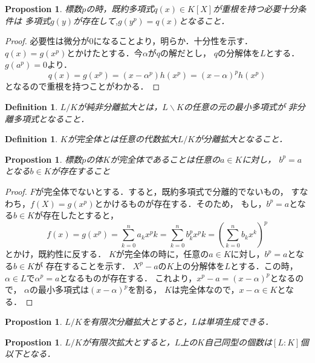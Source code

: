 \documentclass{ujarticle}
\newtheorem{dfn}[thm]{Definition}
\newtheorem{prop}[thm]{Propostion}
\begin{document}
\begin{prop}
  標数$p$の時，既約多項式$q(x) \in K[X]$が重根を持つ必要十分条件は
  多項式$g(y)$が存在して,$g(y^p)=q(x)$となること．
\end{prop}
\begin{proof}
  必要性は微分が$0$になることより，明らか．十分性を示す．
  $q(x)=g(x^p)$とかけたとする．今$ \alpha$が$q$の解だとし，
  $q$の分解体を$L$とする．$g(a^p)=0$より．
  \begin{equation*}
   q(x)=g(x^p)=(x-\alpha^p)h(x^p)=(x-\alpha)^ph(x^p)
  \end{equation*}
  となるので重根を持つことがわかる．
\end{proof}

\begin{dfn}
 $L/K$が純非分離拡大とは，$L\backslash K$の任意の元の最小多項式が
 非分離多項式となること．
\end{dfn}

\begin{dfn}
 $K$が完全体とは任意の代数拡大$L/K$が分離拡大となること．
\end{dfn}

\begin{prop}
 標数$p$の体$K$が完全体であることは任意の$a \in K$に対し，
 $b^p=a$となる$b \in K$が存在すること
\end{prop}
\begin{proof}
  $F$が完全体でないとする．すると，既約多項式で分離的でないもの，
  すなわち，$f(X)=g(x^p)$とかけるものが存在する．そのため，
  もし，$b^p=a$となる$b \in K$が存在したとすると，
  \begin{equation*}
   f(x)=g(x^p)=\sum_{k=0}^na_kx^pk=
  　\sum_{k=0}^nb_k^px^pk=(\sum_{k=0}^nb_kx^k)^p
  \end{equation*}
  とかけ，既約性に反する．
  $K$が完全体の時に，任意の$a \in K$に対し，$b^p=a$となる$b \in K$が
  存在することを示す．
  $X^p-a$の$K$上の分解体を$L$とする．この時，
  $\alpha \in L$で$\alpha^p=a$となるものが存在する．
  これより，$x^p-a=(x-\alpha)^p$となるので，
  $\alpha$の最小多項式は$(x-\alpha)^p$を割る，
  $K$は完全体なので，$x - \alpha \in K$となる．
\end{proof}

\begin{prop}
 $L/K$を有限次分離拡大とすると，$L$は単項生成できる．
\end{prop}


\begin{prop}
 $L/K$が有限次拡大とすると，$L$上の$K$自己同型の個数は$[L:K]$個以下となる．
\end{prop}
\end{document}
